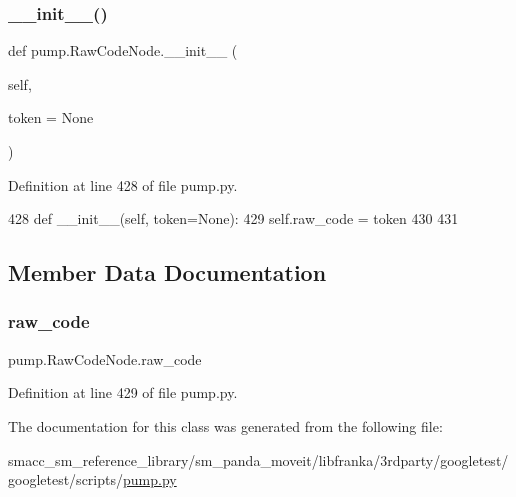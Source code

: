 \subsubsection{\texorpdfstring{\+\_\+\+\_\+init\+\_\+\+\_\+()}{\_\_init\_\_()}}
{\footnotesize\ttfamily def pump.\+Raw\+Code\+Node.\+\_\+\+\_\+init\+\_\+\+\_\+ (\begin{DoxyParamCaption}\item[{}]{self,  }\item[{}]{token = {\ttfamily None} }\end{DoxyParamCaption})}



Definition at line 428 of file pump.\+py.


\begin{DoxyCode}
428   \textcolor{keyword}{def }\_\_init\_\_(self, token=None):
429     self.raw\_code = token
430 
431 
\end{DoxyCode}


\subsection{Member Data Documentation}
\mbox{\label{classpump_1_1RawCodeNode_ab36224d959e0d8f803e9fac8e6a0baab}} 
\subsubsection{\texorpdfstring{raw\+\_\+code}{raw\_code}}
{\footnotesize\ttfamily pump.\+Raw\+Code\+Node.\+raw\+\_\+code}



Definition at line 429 of file pump.\+py.



The documentation for this class was generated from the following file\+:\begin{DoxyCompactItemize}
\item 
smacc\+\_\+sm\+\_\+reference\+\_\+library/sm\+\_\+panda\+\_\+moveit/libfranka/3rdparty/googletest/googletest/scripts/\hyperlink{pump_8py}{pump.\+py}\end{DoxyCompactItemize}
